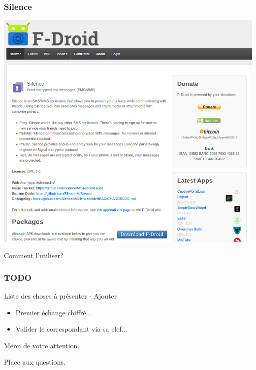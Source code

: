 \documentclass{beamer}
\begin{document}
\begin{frame}
\frametitle{Silence}
\begin{center}
\includegraphics[scale=0.5] {./images/Silence_FDroid.png} 
\end{center}
\end{frame}

\begin{frame}
\Huge{\centerline{Comment l'utiliser?}}
\end{frame}

\begin{frame}
\frametitle{TODO}
\begin{block}{Liste des choses à présenter - Ajouter}
\begin{itemize}
\item Premier échange chiffré...
\item Valider le correspondant via sa clef...
\end{itemize}
\end{block}
\end{frame}

\begin{frame}
\Huge{\centerline{Merci de votre attention.}}
\Huge{\centerline{Place aux questions.}}
\end{frame}
\end{document}
